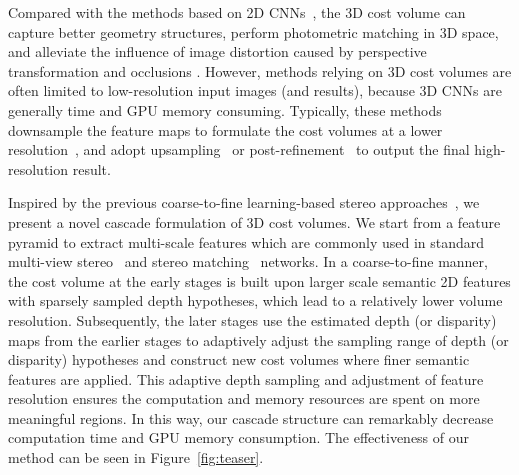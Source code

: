 \documentclass[10pt,twocolumn,letterpaper]{article}
\begin{document}
Compared with the methods based on 2D CNNs~\cite{mayer2016large, zbontar2016stereo}, the 3D cost volume can capture better geometry structures, perform photometric matching in 3D space, and alleviate the influence of image distortion caused by perspective transformation and occlusions \cite{chen2019point}.
However, methods relying on 3D cost volumes are often limited to low-resolution input images (and results),
because 3D CNNs are generally time and GPU memory consuming.
Typically, these methods downsample the feature maps to formulate the cost volumes at a lower resolution~\cite{kendall2017end, chang2018pyramid, guo2019group, zhang2019ga, wu2019iccv_semanticstereo, nie2019multi, im2019dpsnet, yao2018mvsnet, yao2019recurrent, Luo_2019_ICCV, chen2019point}, and adopt upsampling~\cite{kendall2017end, chang2018pyramid, guo2019group, zhang2019ga,nie2019multi, wu2019iccv_semanticstereo,yang2018segstereo, song2018edgestereo} or post-refinement~\cite{Luo_2019_ICCV, chen2019point} to output the final high-resolution result.






















Inspired by the previous coarse-to-fine learning-based stereo approaches~\cite{wang2019anytime,tonioni2019real,yin2019hierarchical}, we present a novel cascade formulation of 3D cost volumes.
We start from a feature pyramid to extract multi-scale features which are commonly used in standard multi-view stereo~\cite{yao2018mvsnet} and stereo matching~\cite{guo2019group, chang2018pyramid} networks.
In a coarse-to-fine manner, the cost volume at the early stages is built upon larger scale semantic 2D features with sparsely sampled depth hypotheses, which lead to a relatively lower volume resolution.
Subsequently, the later stages use the estimated depth (or disparity) maps from the earlier stages to adaptively adjust the sampling range of depth (or disparity) hypotheses and construct new cost volumes where finer semantic features are applied.
This adaptive depth sampling and adjustment of feature resolution ensures the computation and memory resources are spent on more meaningful regions. In this way, our cascade structure can remarkably decrease computation time and GPU memory consumption.
The effectiveness of our method can be seen in Figure~\ref{fig:teaser}.
\end{document}

